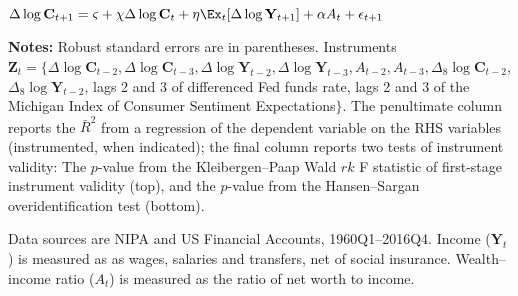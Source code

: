 
\begin{table} \caption{Aggregate Consumption Dynamics in US Data}  \label{table:USCampManVsStickyE}
\centering
\centerline{$\Delta\log\mathbf{C}_{t+1}=\varsigma+\chi\Delta\log\mathbf{C}_t+\eta\Ex_t[\Delta\log\mathbf{Y}_{t+1}]+\alpha A_t+\epsilon_{t+1}$ }
\newsavebox{\CampManBox}  
\usebox{\CampManBox}
{\newlength\TableWidthCM}
\settowidth\TableWidthCM{\usebox{\CampManBox}}
\medskip\medskip \vspace{0.0cm} \parbox{\TableWidthCM}{
  \begin{flushleft}
    \footnotesize   \textbf{Notes:} Robust standard errors are in parentheses.  Instruments $\textbf{Z}_t = \{\Delta \log \mathbf{C}_{t-2}, \Delta \log \mathbf{C}_{t-3}, \Delta \log \mathbf{Y}_{t-2}, \Delta \log \mathbf{Y}_{t-3}, A_{t-2}, A_{t-3}, \Delta_8 \log \mathbf{C}_{t-2}$, $\Delta_8 \log \mathbf{Y}_{t-2}$, lags 2 and 3 of differenced Fed funds rate, lags 2 and 3 of the Michigan Index of Consumer Sentiment Expectations$\}$.  The penultimate column reports the $\bar{R}^2$ from a regression of the dependent variable on the RHS variables (instrumented, when indicated); the final column reports two tests of instrument validity: The $p$-value from the Kleibergen--Paap Wald $rk$ F statistic of first-stage instrument validity (top), and the $p$-value from the Hansen--Sargan overidentification test (bottom).

    Data sources are NIPA and US Financial Accounts, 1960Q1--2016Q4. Income ($\mathbf{Y}_t$) is measured as as wages, salaries and transfers, net of social insurance. Wealth--income ratio ($A_t$) is measured as the ratio of net worth to income. 
  \end{flushleft}
}
\end{table}
